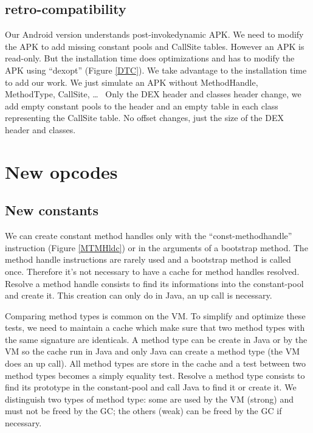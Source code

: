 \documentclass{sig-alternate}
\def \ANDROID{Android\xspace}
\begin{document}
  \subsection{retro-compatibility}
    Our \ANDROID version understands post-invokedynamic APK.
    We need to modify the APK to add missing constant pools and CallSite tables.
    However an APK is read-only.
    But the installation time does optimizations and has to modify the APK using ``dexopt'' (Figure \ref{DTC}).
    We take advantage to the installation time to add our work.
    We just simulate an APK without MethodHandle, MethodType, CallSite, \dots~%
    Only the DEX header and classes header change, we add empty constant pools to the header
    and an empty table in each class representing the CallSite table.
    No offset changes, just the size of the DEX header and classes.

\section{New opcodes}
\label{newConst}
  \subsection{New constants}

    We can create constant method handles only with the ``const-methodhandle'' instruction (Figure \ref{MTMHldc}) or in the arguments of a bootstrap method.
    The method handle instructions are rarely used and a bootstrap method is called once.
    Therefore it's not necessary to have a cache for method handles resolved.
    Resolve a method handle consists to find its informations into the constant-pool and create it.
    This creation can only do in Java, an up call is necessary.

    Comparing method types is common on the VM.
    To simplify and optimize these tests, we need to maintain a cache which make sure that two method types with the same signature are identicals.
    A method type can be create in Java or by the VM so the cache run in Java and only Java can create a method type (the VM does an up call).
    All method types are store in the cache and a test between two method types becomes a simply equality test.
    Resolve a method type consists to find its prototype in the constant-pool and call Java to find it or create it.
    We distinguish two types of method type: some are used by the VM (strong) and must not be freed by the GC; the others (weak) can be freed by the GC if necessary.
\end{document}
